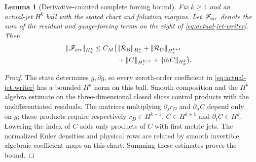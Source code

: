\documentclass[11pt]{article}
\numberwithin{equation}{section}
\newtheorem{lemma}[lemma]{Lemma}
\theoremstyle{definition}
\theoremstyle{remark}
\newcommand{\norm}[1]{\lVert#1\rVert}
\begin{document}
\begin{lemma}[Derivative-counted complete forcing bound]
\label{lem:actual-jet-complete-forcing}
Fix $k\ge4$ and an actual-jet $H^k$ ball with the stated chart and foliation
margins. Let $\mathscr F_{\rm err}$ denote the sum of the residual and
gauge-forcing terms on the right of \eqref{eq:actual-jet-writer}. Then
\begin{align}
 \norm{\mathscr F_{\rm err}}_{H_x^k}
 \le C_M\bigl(&\norm{\mathcal R_{\rm B}}_{H_x^k}
        +\norm{\mathcal R_{\rm D}}_{H_x^{k+1}}\notag\\
        &+\norm C_{H_x^{k+1}}+\norm{\partial_tC}_{H_x^k}\bigr).
 \label{eq:actual-jet-complete-forcing}
\end{align}
\end{lemma}
\begin{proof}
The state determines $g,\partial g$, so every zeroth-order coefficient in
\eqref{eq:actual-jet-writer} has a bounded $H^k$ norm on this ball. Smooth
composition and the $H^k$ algebra estimate on the three-dimensional closed
slices control products with the undifferentiated residuals. The matrices
multiplying $\partial_j r_D$ and $\partial_\alpha C$ depend only on $g$;
these products require respectively $r_D\in H^{k+1}$,
$C\in H^{k+1}$ and $\partial_tC\in H^k$. Lowering the index of $C$ adds only
products of $C$ with first metric jets. The normalized Euler densities and
physical rows are related by smooth invertible algebraic coefficient maps
on this chart. Summing these estimates proves the bound.
\end{proof}
\end{document}
